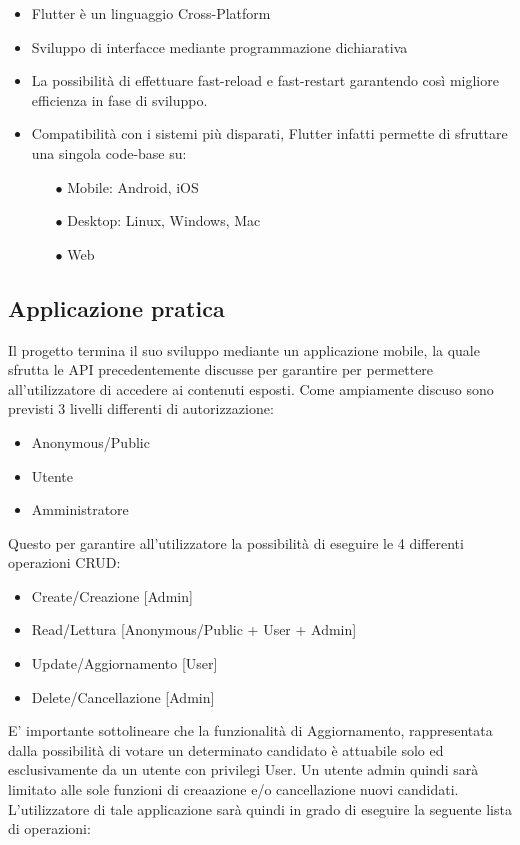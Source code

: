 \documentclass[twoside]{report}
\begin{document}
\begin{itemize}

\item Flutter è un linguaggio Cross-Platform
\item Sviluppo di interfacce mediante programmazione dichiarativa
\item La possibilità di effettuare fast-reload e fast-restart garantendo così migliore efficienza in fase di sviluppo.
\item Compatibilità con i sistemi più disparati, Flutter infatti permette di sfruttare una singola code-base su:
\begin{itemize}
    \item[$\bullet$] Mobile: Android, iOS
    \item[$\bullet$] Desktop: Linux, Windows, Mac
    \item[$\bullet$] Web
    \end{itemize}
\end{itemize}

\subsection{Applicazione pratica}

Il progetto termina il suo sviluppo mediante un applicazione mobile, la quale sfrutta le API precedentemente discusse per garantire per permettere all'utilizzatore di accedere ai contenuti esposti.
\bigbreak
Come ampiamente discuso sono previsti 3 livelli differenti di autorizzazione:

\begin{itemize}
\item Anonymous/Public
\item Utente
\item Amministratore
\end{itemize}

Questo per garantire all'utilizzatore la possibilità di eseguire le 4 differenti operazioni CRUD:

\begin{itemize}
\item Create/Creazione [Admin]
\item Read/Lettura [Anonymous/Public + User + Admin]
\item Update/Aggiornamento [User]
\item Delete/Cancellazione [Admin]
\end{itemize}

E' importante sottolineare che la funzionalità di Aggiornamento, rappresentata dalla possibilità di votare un determinato candidato è attuabile solo ed esclusivamente da un utente con privilegi User. Un utente admin quindi sarà limitato alle sole funzioni di creaazione e/o cancellazione nuovi candidati. 
\bigbreak
L'utilizzatore di tale applicazione sarà quindi in grado di eseguire la seguente lista di operazioni:
\end{document}
